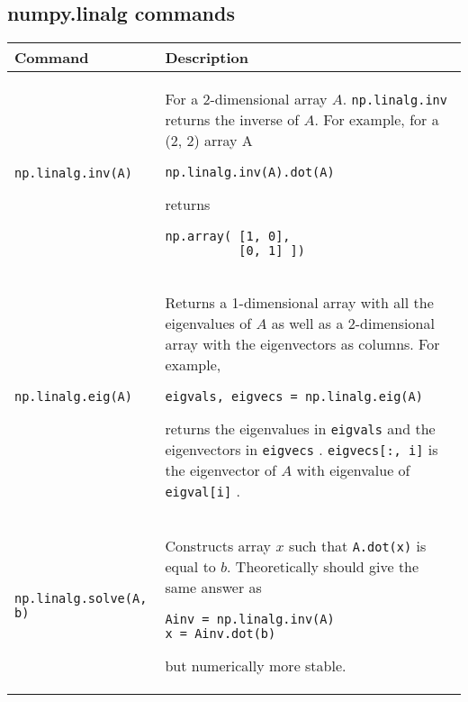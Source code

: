 \documentclass[]{article}
\begin{document}
    \subsection{numpy.linalg commands}
    \begin{longtable}{| m{6cm}  | m{11cm} |}
    \hline
    \textbf{Command} & \textbf{Description} 
    \\\hline
    \texttt{np.linalg.inv(A)} & For a 2-dimensional array $A$.  {\texttt{np.linalg.inv} } returns the inverse of $A$.  For example, for a (2, 2) array A
    \begin{verbatim}
np.linalg.inv(A).dot(A)
    \end{verbatim}
    returns
    \begin{verbatim}
np.array( [1, 0], 
          [0, 1] ])
    \end{verbatim}
    \\\hline
    \texttt{np.linalg.eig(A)} & Returns a 1-dimensional array with all the eigenvalues of $A$ as well as a 2-dimensional array with the eigenvectors as columns.  For example, 
    \begin{verbatim}
eigvals, eigvecs = np.linalg.eig(A)
    \end{verbatim}
    returns the eigenvalues in {\texttt{eigvals} } and the eigenvectors in  {\texttt{eigvecs} }.  {\texttt{eigvecs[:, i]} } is the eigenvector of $A$  with eigenvalue of {\texttt{eigval[i]} }.
    \\\hline
    \texttt{np.linalg.solve(A, b)} & Constructs array $x$ such that {\texttt{A.dot(x)} } is equal to $b$.  Theoretically should give the same answer as
    \begin{verbatim}
Ainv = np.linalg.inv(A)
x = Ainv.dot(b)
    \end{verbatim} 
    but numerically more stable.
    \\\hline
    \end{longtable}

\end{document}
